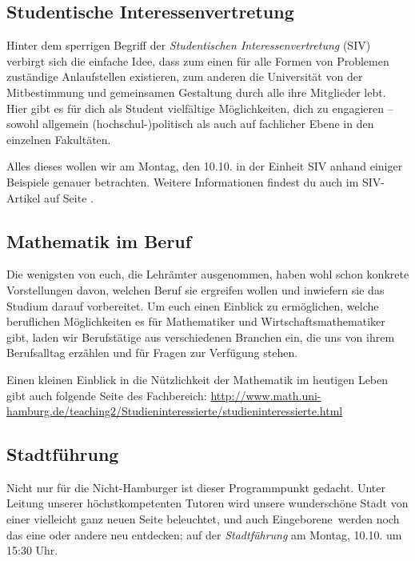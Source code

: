 \subsection*{Studentische Interessenvertretung}

Hinter dem sperrigen Begriff der \emph{Studentischen Interessenvertretung}
(SIV) verbirgt sich die einfache Idee, dass zum einen für alle Formen von
Problemen zuständige Anlaufstellen existieren, zum anderen die Universität von
der Mitbestimmung und gemeinsamen Gestaltung durch alle ihre Mitglieder lebt.
Hier gibt es für dich als Student vielfältige Möglichkeiten, dich zu engagieren
-- sowohl allgemein (hochschul-)politisch als auch auf fachlicher Ebene in den
einzelnen Fakultäten.


Alles dieses wollen wir am Montag, den 10.10. in der Einheit SIV anhand einiger
Beispiele genauer betrachten. Weitere Informationen findest du auch im
SIV-Artikel auf Seite \pageref{page:siv}.

\subsection*{Mathematik im Beruf}

Die wenigsten von euch, die Lehrämter ausgenommen, haben wohl schon konkrete
Vorstellungen davon, welchen Beruf sie ergreifen wollen und inwiefern sie das
Studium darauf vorbereitet. Um euch einen Einblick zu ermöglichen, welche
beruflichen Möglichkeiten es für Mathematiker und Wirtschaftsmathematiker gibt,
laden wir Berufstätige aus verschiedenen Branchen ein, die uns von ihrem
Berufsalltag erzählen und für Fragen zur Verfügung stehen.

Einen kleinen Einblick in die Nützlichkeit der Mathematik im heutigen Leben
gibt auch folgende Seite des Fachbereich:
\url{http://www.math.uni-hamburg.de/teaching2/Studieninteressierte/studieninteressierte.html}

\subsection*{Stadtführung}


Nicht nur für die Nicht-Hamburger ist dieser Programmpunkt gedacht.  Unter
Leitung unserer höchstkompetenten Tutoren wird unsere wunderschöne Stadt von
einer vielleicht ganz neuen Seite beleuchtet, und auch \glqq Eingeborene\grqq\
werden noch das eine oder andere neu entdecken; auf der \emph{Stadtführung} am
Montag, 10.10. um 15:30 Uhr.

